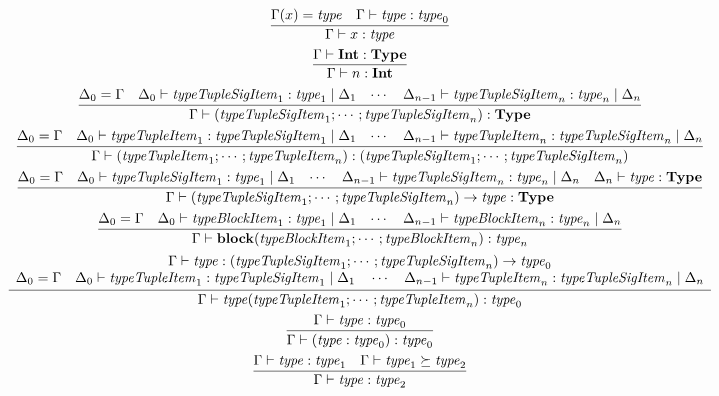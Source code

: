 \begin{gather*}
  \infer{\Gamma \vdash x: \mathit{type}}{
    \Gamma(x) = \mathit{type}
    &
    \Gamma \vdash \mathit{type}: \mathit{type}_0
  }
  \\
  \infer{\Gamma \vdash n: \mathbf{Int}}{
    \Gamma \vdash \mathbf{Int}: \mathbf{Type}
  }
  \\
  \infer{\Gamma \vdash (\mathit{typeTupleSigItem}_1; \cdots; \mathit{typeTupleSigItem}_n): \mathbf{Type}}{
    \Delta_0 = \Gamma
    &
    \Delta_0 \vdash \mathit{typeTupleSigItem}_1: \mathit{type}_1 \mid \Delta_1
    &
    \cdots
    &
    \Delta_{n - 1} \vdash \mathit{typeTupleSigItem}_n: \mathit{type}_n \mid \Delta_n
  }
  \\
  \infer{\Gamma \vdash (\mathit{typeTupleItem}_1; \cdots; \mathit{typeTupleItem}_n): (\mathit{typeTupleSigItem}_1; \cdots; \mathit{typeTupleSigItem}_n)}{
    \Delta_0 = \Gamma
    &
    \Delta_0 \vdash \mathit{typeTupleItem}_1: \mathit{typeTupleSigItem}_1 \mid \Delta_1
    &
    \cdots
    &
    \Delta_{n - 1} \vdash \mathit{typeTupleItem}_n: \mathit{typeTupleSigItem}_n \mid \Delta_n
  }
  \\
  \infer{\Gamma \vdash (\mathit{typeTupleSigItem}_1; \cdots; \mathit{typeTupleSigItem}_n) \rightarrow \mathit{type}: \mathbf{Type}}{
    \Delta_0 = \Gamma
    &
    \Delta_0 \vdash \mathit{typeTupleSigItem}_1: \mathit{type}_1 \mid \Delta_1
    &
    \cdots
    &
    \Delta_{n - 1} \vdash \mathit{typeTupleSigItem}_n: \mathit{type}_n \mid \Delta_n
    &
    \Delta_n \vdash \mathit{type}: \mathbf{Type}
  }
  \\
  \infer{\Gamma \vdash \mathbf{block}(\mathit{typeBlockItem}_1; \cdots; \mathit{typeBlockItem}_n): \mathit{type}_n}{
    \Delta_0 = \Gamma
    &
    \Delta_0 \vdash \mathit{typeBlockItem}_1: \mathit{type}_1 \mid \Delta_1
    &
    \cdots
    &
    \Delta_{n - 1} \vdash \mathit{typeBlockItem}_n: \mathit{type}_n \mid \Delta_n
  }
  \\
  \infer{\Gamma \vdash \mathit{type}(\mathit{typeTupleItem}_1; \cdots; \mathit{typeTupleItem}_n): \mathit{type}_0}{
    \begin{array}{c}
      \Gamma \vdash \mathit{type}: (\mathit{typeTupleSigItem}_1; \cdots; \mathit{typeTupleSigItem}_n) \rightarrow \mathit{type}_0
      \\
      \Delta_0 = \Gamma
      \hspace{1em}
      \Delta_0 \vdash \mathit{typeTupleItem}_1: \mathit{typeTupleSigItem}_1 \mid \Delta_1
      \hspace{1em}
      \cdots
      \hspace{1em}
      \Delta_{n - 1} \vdash \mathit{typeTupleItem}_n: \mathit{typeTupleSigItem}_n \mid \Delta_n
    \end{array}
  }
  \\
  \infer{\Gamma \vdash (\mathit{type}: \mathit{type}_0): \mathit{type}_0}{
    \Gamma \vdash \mathit{type}: \mathit{type}_0
  }
  \\
  \infer{\Gamma \vdash \mathit{type}: \mathit{type}_2}{
    \Gamma \vdash \mathit{type}: \mathit{type}_1
    &
    \Gamma \vdash \mathit{type}_1 \succeq \mathit{type}_2
  }
\end{gather*}

